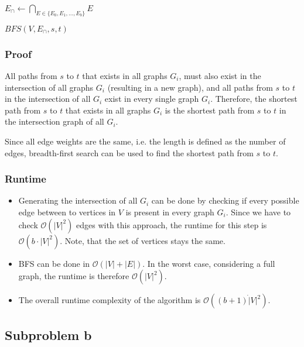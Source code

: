 \documentclass[12pt]{article}
\begin{document}
\begin{algorithmic}
	\State $E_\cap \gets \bigcap_{E \in \{E_0, E_1, \ldots, E_b\}} E$
	
	\Return $\mathit{BFS}(V, E_\cap, s, t)$
\end{algorithmic}

\subsubsection*{Proof}
All paths from $s$ to $t$ that exists in all graphs $G_i$, must also exist in the intersection of all graphs $G_i$ (resulting in a new graph), and all paths from $s$ to $t$ in the intersection of all $G_i$ exist in every single graph $G_i$. Therefore, the shortest path from $s$ to $t$ that exists in all graphs $G_i$ is the shortest path from $s$ to $t$ in the intersection graph of all $G_i$.

Since all edge weights are the same, i.e. the length is defined as the number of edges, breadth-first search can be used to find the shortest path from $s$ to $t$.

\subsubsection*{Runtime}
\begin{itemize}
	\item Generating the intersection of all $G_i$ can be done by checking if every possible edge between to vertices in $V$ is present in every graph $G_i$. Since we have to check $\mathcal{O}(|V|^2)$ edges with this approach, the runtime for this step is $\mathcal{O}(b \cdot |V|^2)$. Note, that the set of vertices stays the same.
	\item BFS can be done in $\mathcal{O}(|V| + |E|)$. In the worst case, considering a full graph, the runtime is therefore $\mathcal{O}(|V|^2)$.
	\item The overall runtime complexity of the algorithm is $\mathcal{O}((b+1) \dot |V|^2)$.
\end{itemize}

\subsection*{Subproblem b}
\end{document}
